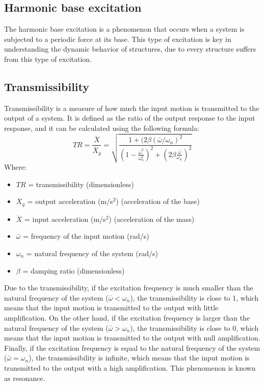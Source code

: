 \documentclass{article}  %
\begin{document}
\subsection{Harmonic base excitation}
The harmonic base excitation is a phenomenon that occurs when a system is subjected to a periodic force at its base. This type of excitation is key in understanding the dynamic behavior of structures, due to every structure suffers from this type of excitation. 

\subsection{Transmissibility}
Transmissibility is a measure of how much the input motion is transmitted to the output of a system. It is defined as the ratio of the output response to the input response, and it can be calculated using the following formula:
\begin{equation}
TR = \frac{\ddot{X}}{\ddot{X_g}} = \sqrt{\frac{1+(2 \beta (\bar{\omega}/\omega_n)^2}{(1 - \frac{\bar{\omega}^2}{\omega_n^2})^2 + (2\beta\frac{\bar{\omega}}{\omega_n})^2}} 
\label{eq:transmissibility}
\end{equation}
Where:
\begin{itemize}
  \item $TR$ = transmissibility (dimensionless)
  \item $\ddot{X_g}$ = output acceleration (m/s$^2$) (acceleration of the base) 
  \item $\ddot{X}$ = input acceleration (m/s$^2$) (acceleration of the mass)
  \item $\bar{\omega}$ = frequency of the input motion (rad/s)
  \item $\omega_n$ = natural frequency of the system (rad/s)
  \item $\beta$ = damping ratio (dimensionless)
\end{itemize}

Due to the transmissibility, if the excitation frequency is much smaller than the natural frequency of the system ($\bar{\omega} < \omega_n$), the transmissibility is close to 1, which means that the input motion is transmitted to the output with little amplification. On the other hand, if the excitation frequency is larger than the natural frequency of the system ($\bar{\omega} > \omega_n$), the transmissibility is close to 0, which means that the input motion is transmitted to the output with null amplification. Finally, if the excitation frequency is equal to the natural frequency of the system ($\bar{\omega} = \omega_n$), the transmissibility is infinite, which means that the input motion is transmitted to the output with a high amplification. This phenomenon is known as resonance.
\end{document}
